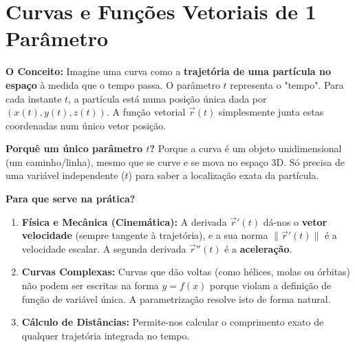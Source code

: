 \documentclass[11pt,a4paper]{article}
\begin{document}
\newpage

\section{Curvas e Funções Vetoriais de 1 Parâmetro}
\label{chap:curvas_funcoes_vetoriais}

\begin{tcolorbox}[
  colback=lightGray,
  colframe=primaryColor,
  fonttitle=\bfseries,
  title={Intuição e Utilidade: Porquê Curvas e Funções Vetoriais?},
  arc=3pt,
  left=6pt, right=6pt, top=4pt, bottom=4pt,
  boxrule=1.2pt,
  before=\vspace{2pt},
  after=\vspace{2pt}
]
  \small
  \textbf{O Conceito:} Imagine uma curva como a \textbf{trajetória de uma partícula no espaço} à medida que o tempo passa. O parâmetro $t$ representa o "tempo". Para cada instante $t$, a partícula está numa posição única dada por $(x(t), y(t), z(t))$. A função vetorial $\vec{r}(t)$ simplesmente junta estas coordenadas num único vetor posição.
  
  \textbf{Porquê um único parâmetro $t$?} Porque a curva é um objeto unidimensional (um caminho/linha), mesmo que se curve e se mova no espaço 3D. Só precisa de uma variável independente ($t$) para saber a localização exata da partícula.
  
  \textbf{Para que serve na prática?}
  \begin{enumerate}[leftmargin=*, noitemsep, topsep=1pt, parsep=0pt]
    \item \textbf{Física e Mecânica (Cinemática):} A derivada $\vec{r}'(t)$ dá-nos o \textbf{vetor velocidade} (sempre tangente à trajetória), e a sua norma $\|\vec{r}'(t)\|$ é a velocidade escalar. A segunda derivada $\vec{r}''(t)$ é a \textbf{aceleração}.
    \item \textbf{Curvas Complexas:} Curvas que dão voltas (como hélices, molas ou órbitas) não podem ser escritas na forma $y = f(x)$ porque violam a definição de função de variável única. A parametrização resolve isto de forma natural.
    \item \textbf{Cálculo de Distâncias:} Permite-nos calcular o comprimento exato de qualquer trajetória integrada no tempo.
  \end{enumerate}
\end{tcolorbox}
\end{document}
